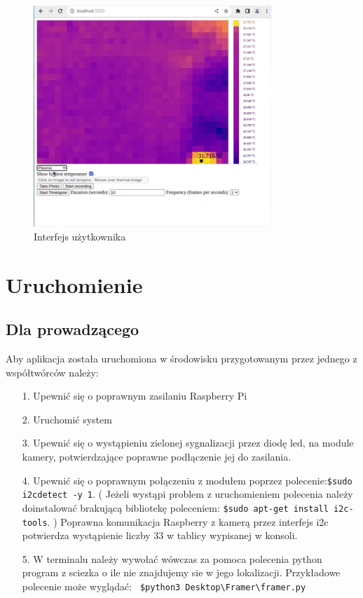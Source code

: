 \documentclass[a4paper,twoside,12pt]{book}
\begin{document}
\begin{figure}[h]
  \centering
  \includegraphics[width=0.8\textwidth]{frame_014_delay-0.1s.png}
  \caption{Interfejs użytkownika}
  \label{fig:obrazek}
\end{figure}









\chapter{Uruchomienie}
\label{ch:Uruchomienie}
\section{Dla prowadzącego}

Aby aplikacja została uruchomiona w środowisku przygotowanym przez jednego z współtwórców należy:
\begin{itemize}
    \item[1.] Upewnić się o poprawnym zasilaniu Raspberry Pi
    \item[2.] Uruchomić system 
    \item[3.] Upewnić się o wystąpieniu zielonej sygnalizacji przez diodę led, na module kamery, potwierdzające poprawne podłączenie jej do zasilania.
    \item[4.] Upewnić się o poprawnym połączeniu z modułem poprzez polecenie:\newline \lstinline|$sudo i2cdetect -y 1|.
(  Jeżeli wystąpi problem z uruchomieniem polecenia należy doinstalować brakującą bibliotekę poleceniem: \newline \lstinline|$sudo apt-get install i2c-tools|. )
Poprawna komunikacja Raspberry z kamerą przez interfejs i2c potwierdza wystąpienie liczby 33 w tablicy wypisanej w konsoli.
    \item[5.] W terminalu należy wywołać wówczas za pomoca polecenia python program z sciezka o ile nie znajdujemy sie w jego lokalizacji. Przykładowe polecenie może wyglądać: \lstinline| $python3 Desktop\Framer\framer.py|


\end{itemize}
\end{document}

